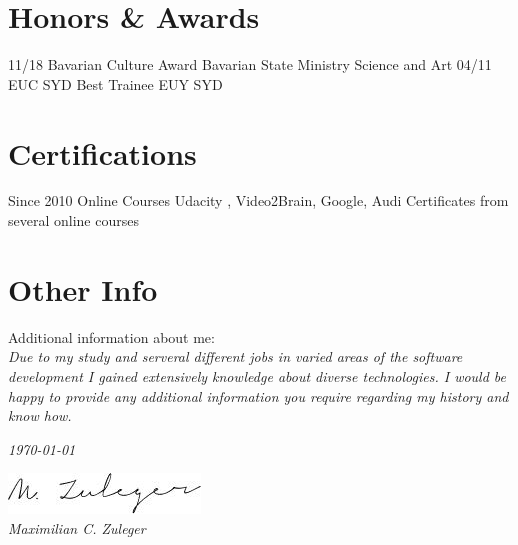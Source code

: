 \documentclass[]{friggeri-cv}
\begin{document}
\section{Honors \& Awards}
\begin{entrylist}
\entry
    {11/18}
    {Bavarian Culture Award}
    {Bavarian State Ministry Science and Art}
    {}
  \entry
    {04/11}
    {EUC SYD Best Trainee}
    {EUY SYD}
    {}
\end{entrylist}

\section{Certifications}
\begin{entrylist}
  \entry
    {Since 2010}
    {Online Courses}
    {Udacity , Video2Brain, Google, Audi}
    {Certificates from several online courses}
\end{entrylist}

\section{Other Info}
Additional information about me:\\
\emph{Due to my study and serveral different jobs in varied areas of the software development I gained extensively knowledge about diverse technologies. I would be happy to provide any additional information you require regarding my history and know how.}
~
\begin{flushleft}
\emph{\today}
\end{flushleft}
\begin{flushright}
\includegraphics[scale=1]{img/covering.jpg}\\
\emph{Maximilian C. Zuleger}
\end{flushright}
\clearpage
\end{document}
